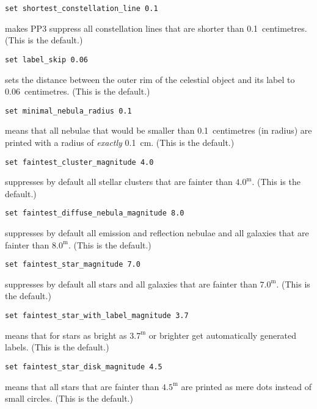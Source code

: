 \documentclass{article}
\newcommand{\PPthree}{\textsf{PP3}\xspace}
\newcommand{\subsubskip}{\bigskip}
\begin{document}
\begin{multicols*}{3}
\begin{lstlisting}
set shortest_constellation_line 0.1
\end{lstlisting}
makes \PPthree suppress all constellation lines that are shorter than
0.1~centimetres.  (This is the default.)\subsubskip

\begin{lstlisting}
set label_skip 0.06
\end{lstlisting}
sets the distance between the outer rim of the celestial object and its label
to 0.06~centimetres.  (This is the default.)\subsubskip

\begin{lstlisting}
set minimal_nebula_radius 0.1
\end{lstlisting}
means that all nebulae that would be smaller than 0.1~centimetres (in radius)
are printed with a radius of \emph{exactly} 0.1~cm.  (This is the
default.)\subsubskip

\begin{lstlisting}
set faintest_cluster_magnitude 4.0
\end{lstlisting}
suppresses by default all stellar clusters that are fainter than $4.0^{\mathrm
  m}$.  (This is the default.)\subsubskip

\columnbreak
\begin{lstlisting}
set faintest_diffuse_nebula_magnitude 8.0
\end{lstlisting}
suppresses by default all emission and reflection nebulae and all galaxies that
are fainter than $8.0^{\mathrm m}$.  (This is the default.)\subsubskip

\begin{lstlisting}
set faintest_star_magnitude 7.0
\end{lstlisting}
suppresses by default all stars and all galaxies that are fainter than
$7.0^{\mathrm m}$.  (This is the default.)\subsubskip

\begin{lstlisting}
set faintest_star_with_label_magnitude 3.7
\end{lstlisting}
means that for stars as bright as $3.7^{\mathrm m}$ or brighter get
automatically generated labels.  (This is the default.)\subsubskip

\begin{lstlisting}
set faintest_star_disk_magnitude 4.5
\end{lstlisting}
means that all stars that are fainter than $4.5^{\mathrm m}$ are printed as
mere dots instead of small circles.  (This is the default.)\subsubskip



\end{multicols*}
\end{document}
